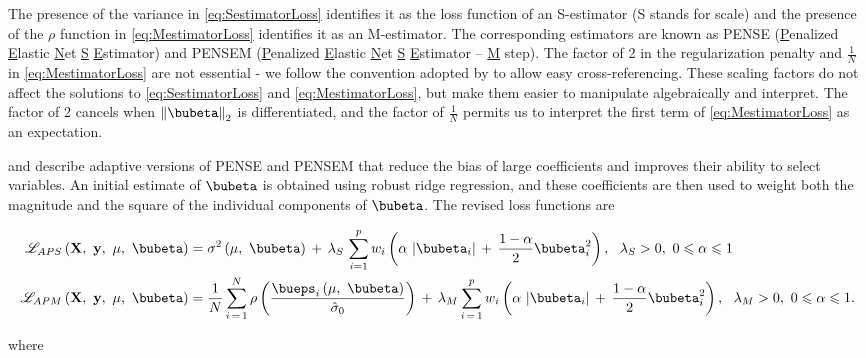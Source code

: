 \documentclass[graybox,envcountchap,sectrefs]{svmono}\usepackage[]{graphicx}\usepackage[]{xcolor}
\begin{document}
\begin{appendices}
The presence of the variance in \eqref{eq:SestimatorLoss} identifies
it as the loss function of an S-estimator (S stands for scale) and
the presence of the $\rho$ function in \eqref{eq:MestimatorLoss}
identifies it as an M-estimator. The corresponding estimators are
known as PENSE (\uline{P}enalized \uline{E}lastic \uline{N}et
\uline{S} \uline{E}stimator) and PENSEM (\uline{P}enalized
\uline{E}lastic \uline{N}et \uline{S} \uline{E}stimator
-- \uline{M} step). The factor of 2 in the regularization penalty
and $\frac{1}{N}$ in \eqref{eq:MestimatorLoss} are not essential
- we follow the convention adopted by \citet{FreueKepplingerSalibianSmucler2019}
to allow easy cross-referencing. These scaling factors do not affect
the solutions to \eqref{eq:SestimatorLoss} and \eqref{eq:MestimatorLoss},
but make them easier to manipulate algebraically and interpret. The
factor of 2 cancels when $\left\Vert \bubeta\right\Vert _{2}$ is
differentiated, and the factor of $\frac{1}{N}$ permits us to interpret
the first term of \eqref{eq:MestimatorLoss} as an expectation.

\citet{Kepplinger2023} and \citet{KepplingerCohen2023} describe
adaptive versions of PENSE and PENSEM that reduce the bias of large
coefficients and improves their ability to select variables. An initial
estimate of $\bubeta$ is obtained using robust ridge regression,
and these coefficients are then used to weight both the magnitude
and the square of the individual components of $\bubeta$. The revised
loss functions are

\begin{subequations}
\begin{align}
\mathscr{L}_{APS}\left(\mathbf{X},\ \mathbf{y},\ \mu,\ \bubeta\right) & =\sigma^{2}\left(\mu,\ \bubeta\right)\,+\,\lambda_{S}\,\sum_{i=1}^{p}w_{i}\left(\alpha\,\left|\bubeta_{i}\right|\,+\,\frac{1-\alpha}{2}\bubeta_{i}^{2}\right),\ \ \lambda_{S}>0,\ 0\leqslant\alpha\leqslant1\label{eq:AdaptiveSestimatorLoss}\\
\mathscr{L}_{APM}\left(\mathbf{X},\ \mathbf{y},\ \mu,\ \bubeta\right) & =\frac{1}{N}\sum_{i\,=\,1}^{N}\rho\left(\frac{\bueps_{i}\left(\mu,\ \bubeta\right)}{\hat{\sigma}_{0}}\right)\,+\,\lambda_{M}\sum_{i\,=\,1}^{p}w_{i}\left(\alpha\,\left|\bubeta_{i}\right|\,+\,\frac{1-\alpha}{2}\bubeta_{i}^{2}\right),\ \ \lambda_{M}>0,\ 0\leqslant\alpha\leqslant1.\label{eq:AdaptiveMestimatorLoss}
\end{align}
\end{subequations}

where


\end{appendices}
\end{document}
